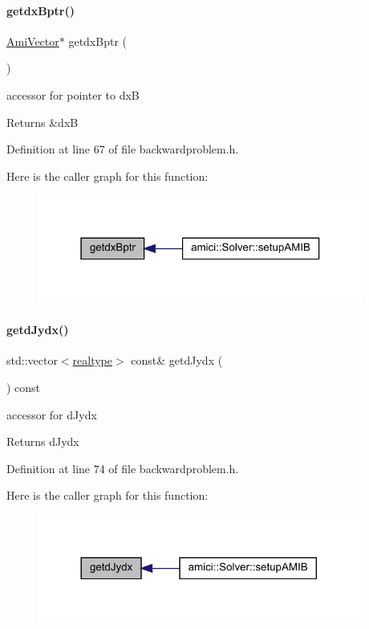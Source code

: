 \paragraph{\texorpdfstring{getdx\+Bptr()}{getdxBptr()}}
{\footnotesize\ttfamily \mbox{\hyperlink{classamici_1_1_ami_vector}{Ami\+Vector}}$\ast$ getdx\+Bptr (\begin{DoxyParamCaption}{ }\end{DoxyParamCaption})}

accessor for pointer to dxB \begin{DoxyReturn}{Returns}
\&dxB 
\end{DoxyReturn}


Definition at line 67 of file backwardproblem.\+h.

Here is the caller graph for this function\+:
\nopagebreak
\begin{figure}[H]
\begin{center}
\leavevmode
\includegraphics[width=303pt]{classamici_1_1_backward_problem_ab1f652d5ffaf80adab677b0a8393b48a_icgraph}
\end{center}
\end{figure}
\mbox{\label{classamici_1_1_backward_problem_aaa2f33176422b55808979bfc7ceb2573}} 
\paragraph{\texorpdfstring{getd\+Jydx()}{getdJydx()}}
{\footnotesize\ttfamily std\+::vector$<$\mbox{\hyperlink{namespaceamici_a1bdce28051d6a53868f7ccbf5f2c14a3}{realtype}}$>$ const\& getd\+Jydx (\begin{DoxyParamCaption}{ }\end{DoxyParamCaption}) const}

accessor for d\+Jydx \begin{DoxyReturn}{Returns}
d\+Jydx 
\end{DoxyReturn}


Definition at line 74 of file backwardproblem.\+h.

Here is the caller graph for this function\+:
\nopagebreak
\begin{figure}[H]
\begin{center}
\leavevmode
\includegraphics[width=300pt]{classamici_1_1_backward_problem_aaa2f33176422b55808979bfc7ceb2573_icgraph}
\end{center}
\end{figure}
